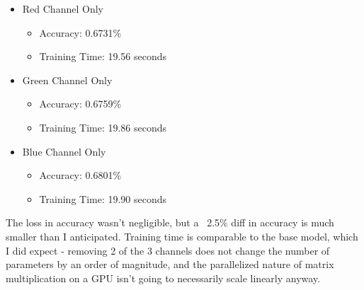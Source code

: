 \documentclass{article}
\begin{document}
    \begin{itemize}
        \item Red Channel Only
        \begin{itemize}
            \item Accuracy: 0.6731\%
            \item Training Time: 19.56 seconds
        \end{itemize}
        \item Green Channel Only
        \begin{itemize}
            \item Accuracy: 0.6759\%
            \item Training Time: 19.86 seconds
        \end{itemize}
        \item Blue Channel Only
        \begin{itemize}
            \item Accuracy: 0.6801\%
            \item Training Time: 19.90 seconds
        \end{itemize}
    \end{itemize}

    The loss in accuracy wasn't negligible, but a ~2.5\% diff in accuracy is much smaller than I anticipated.
    Training time is comparable to the base model, which I did expect - removing 2 of the 3 channels does not change the number of parameters by an order of magnitude, and the parallelized nature of matrix multiplication on a GPU isn't going to necessarily scale linearly anyway.
\end{document}
